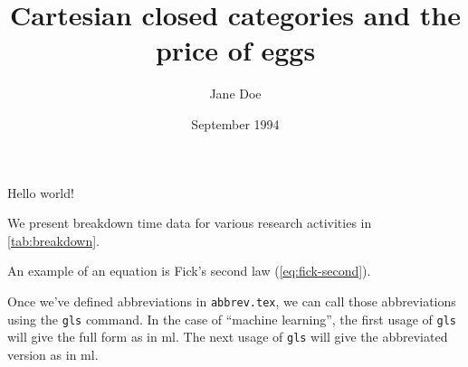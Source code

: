 \documentclass{article}
\title{Cartesian closed categories and the price of eggs}
\author{Jane Doe}
\date{September 1994}
\begin{document}
   \maketitle
   Hello world!

We present breakdown time data for various research activities in \cref{tab:breakdown}.


An example of an equation is Fick's second law (\cref{eq:fick-second}).


Once we've defined abbreviations in \texttt{abbrev.tex}, we can call those abbreviations using the \texttt{gls} command. In the case of ``machine learning'', the first usage of \texttt{gls} will give the full form as in \gls{ml}. The next usage of \texttt{gls} will give the abbreviated version as in \gls{ml}.

\printglossaries
\end{document}
